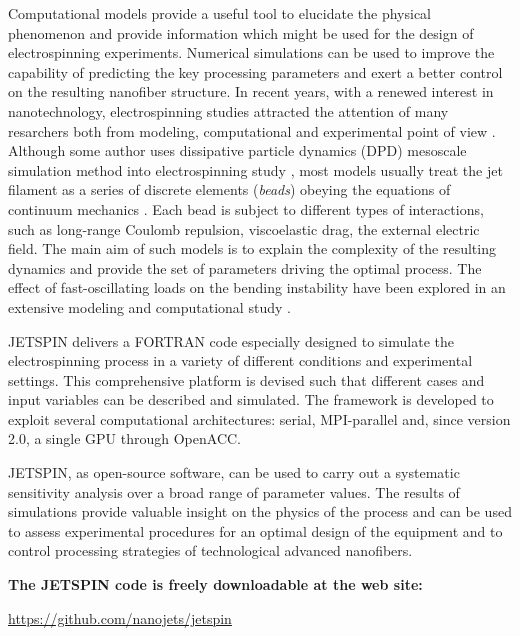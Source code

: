 Computational models provide a useful tool to elucidate the physical
phenomenon and provide information which might be used for the design
of electrospinning experiments. Numerical simulations can be used
to improve the capability of predicting the key processing parameters
and exert a better control on the resulting nanofiber structure. In
recent years, with a renewed interest in nanotechnology, electrospinning
studies attracted the attention of many resarchers both from modeling,
computational and experimental point of view \cite{reneker2000bending,yarin2001taylor,fridrikh2003controlling,theron2004experimental,lu2006computer,zeng2006numerical}.
Although some author uses dissipative particle dynamics (DPD) mesoscale
simulation method into electrospinning study \cite{wang2013simulation},
most models usually treat the jet filament as a series of discrete
elements ({\em beads}) obeying the equations of continuum mechanics
\cite{reneker2000bending,yarin2001taylor}. Each bead is subject to
different types of interactions, such as long-range Coulomb repulsion,
viscoelastic drag, the external electric field. The main aim of such
models is to explain the complexity of the resulting dynamics and
provide the set of parameters driving the optimal process. The effect
of fast-oscillating loads on the bending instability have been explored
in an extensive modeling and computational study \cite{coluzza2014ultrathin}.

JETSPIN delivers a FORTRAN code especially designed to simulate the
electrospinning process in a variety of different conditions and experimental
settings. This comprehensive platform is devised such that different
cases and input variables can be described and simulated. The framework
is developed to exploit several computational architectures: serial,
MPI-parallel and, since version 2.0, a single GPU through OpenACC.

JETSPIN, as open-source software, can be used to carry out a systematic
sensitivity analysis over a broad range of parameter values. The results
of simulations provide valuable insight on the physics of the process
and can be used to assess experimental procedures for an optimal design
of the equipment and to control processing strategies of technological
advanced nanofibers.

\textbf{The JETSPIN code is freely downloadable at the web site: }

\bigskip{}

\begin{center}
\href{https://github.com/nanojets/jetspin}{https://github.com/nanojets/jetspin}
\par\end{center}
